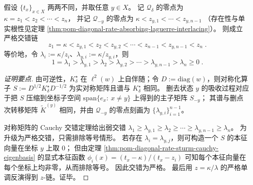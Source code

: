 \begin{theorem}[全谱与删点谱的严格交错链]\label{thm:pom-diagonal-rate-absorbing-full-vs-deleted-interlacing}
假设 \(\{t_x\}_{x\in X}\) 两两不同，并取任意 \(y\in X\)。
记 \(\mathcal Q_\delta\) 的零点为
\(
\kappa=z_1<z_2<\cdots<z_n
\)，
并记 \(\mathcal Q_{-y}\) 的零点为
\(
\kappa<z_{y,1}<\cdots<z_{y,n-1}
\)
（存在性与单实根性见定理 \ref{thm:pom-diagonal-rate-absorbing-laguerre-interlacing}）。
则成立严格交错链
\[
\boxed{\;
z_1=\kappa<z_{y,1}<z_2<z_{y,2}<\cdots<z_{n-1}<z_{y,n-1}<z_n\; } .
\]
等价地，令 \(\lambda_i:=\kappa/z_i\)、\(\lambda_{y,i}:=\kappa/z_{y,i}\)，则
\[
\boxed{\;
1=\lambda_1>\lambda_{y,1}>\lambda_2>\lambda_{y,2}>\cdots>\lambda_{y,n-1}>\lambda_n\ge 0\; } .
\]
\end{theorem}
\begin{proof}[证明要点]
由可逆性，\(K^\star_\delta\) 在 \(\ell^2(w)\) 上自伴随；令 \(D:=\mathrm{diag}(w)\)，则对称化算子
\(
S:=D^{1/2}K^\star_\delta D^{-1/2}
\)
为实对称矩阵且谱与 \(K^\star_\delta\) 相同。
删去状态 \(y\) 的吸收过程对应于把 \(S\) 压缩到坐标子空间 \(\mathrm{span}\{e_x:\ x\ne y\}\) 上得到的主子矩阵 \(S_{-y}\)；
其谱与删点次转移矩阵 \(\widetilde K^{(y)}\) 相同，并由 \(\mathcal Q_{-y}\) 的零点刻画为 \(\{\lambda_{y,i}\}_{i=1}^{n-1}\)。
\par
对称矩阵的 Cauchy 交错定理给出弱交错
\(
\lambda_1\ge \lambda_{y,1}\ge \lambda_2\ge\cdots\ge \lambda_{y,n-1}\ge \lambda_n
\)。
为升级为严格交错，只需排除等号情形。
若存在 \(\lambda_i=\lambda_{y,j}\)，则可构造一个 \(S\) 的本征向量在坐标 \(y\) 上取 \(0\)；
但由定理 \ref{thm:pom-diagonal-rate-sturm-cauchy-eigenbasis} 的显式本征函数
\(
\phi_i(x)=(t_x-\kappa)/(t_x-z_i)
\)
可知每个本征向量在每个坐标上均非零，从而排除等号。
因此交错为严格。
最后用 \(z=\kappa/\lambda\) 的严格单调反演得到 \(z\)-链。证毕。
\end{proof}

\endinput
